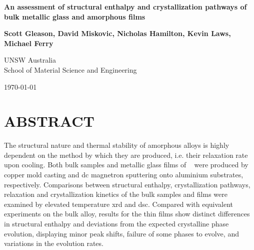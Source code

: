 \documentclass[a4paper,12pt,oneside]{article}%
\begin{document}
\thispagestyle{empty} %
\begin{titlepage}
\begin{center}
\vspace*{1cm}
	
\textbf{\LARGE{An assessment of structural enthalpy and crystallization pathways of \MgZnCa~ bulk metallic glass and amorphous films}}

\vspace{2cm}

\textbf{Scott Gleason, David Miskovic, Nicholas Hamilton, Kevin Laws, Michael Ferry}

\vspace{2cm}

UNSW Australia\\ School of Material Science and Engineering

\vspace{2cm}

\today
\end{center}
\end{titlepage}

\clearpage 
{}


\section*{ABSTRACT}

The structural nature and thermal stability of amorphous alloys is highly dependent on the method by which they are produced, i.e. their relaxation rate upon cooling.  Both bulk samples and metallic glass films of \MgZnCa~ were produced by copper mold casting and \gls{dc} magnetron sputtering onto aluminium substrates, respectively. Comparisons between structural enthalpy, crystallization pathways, relaxation and crystallization kinetics of the bulk samples and films were examined by elevated temperature \acrshort{xrd} and \acrshort{dsc}. Compared with equivalent experiments on the bulk alloy, results for the thin films show distinct differences in structural enthalpy and deviations from the expected crystalline phase evolution, displaying minor peak shifts, failure of some phases to evolve, and variations in the evolution rates. 

\end{document}
